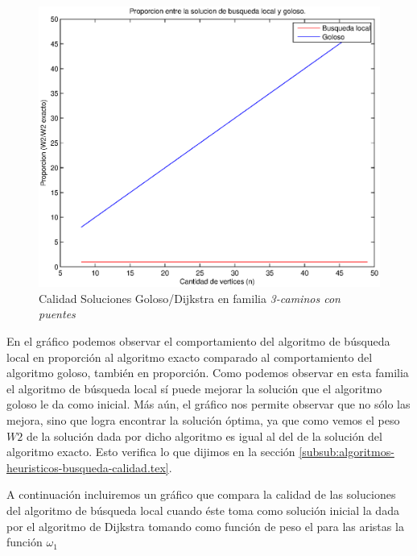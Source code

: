 \begin{figure}[H]
  \begin{center}
    \begin{minipage}{0.5\linewidth}
      \includegraphics[width=\linewidth]{graficos/busq_local_proporcion2.eps}
      \caption{Calidad Soluciones Goloso/Dijkstra en familia \emph{3-caminos con puentes}}\label{fig:busq-local-proporcion-2}
    \end{minipage}
  \end{center}
\end{figure}

En el gráfico podemos observar el comportamiento del algoritmo de búsqueda local en proporción al algoritmo exacto comparado al comportamiento del algoritmo goloso, también en proporción. Como podemos observar en esta familia el algoritmo de búsqueda local sí puede mejorar la solución que el algoritmo goloso le da como inicial. Más aún, el gráfico nos permite observar que no sólo las mejora, sino que logra encontrar la solución óptima, ya que como vemos el peso $W2$ de la solución dada por dicho algoritmo es igual al del de la solución del algoritmo exacto. Esto verifica lo que dijimos en la sección \ref{subsub:algoritmos-heuristicos-busqueda-calidad.tex}.

A continuación incluiremos un gráfico que compara la calidad de las soluciones del algoritmo de búsqueda local cuando éste toma como solución inicial la dada por el algoritmo de Dijkstra tomando como función de peso el para las aristas la función $\omega_1$


